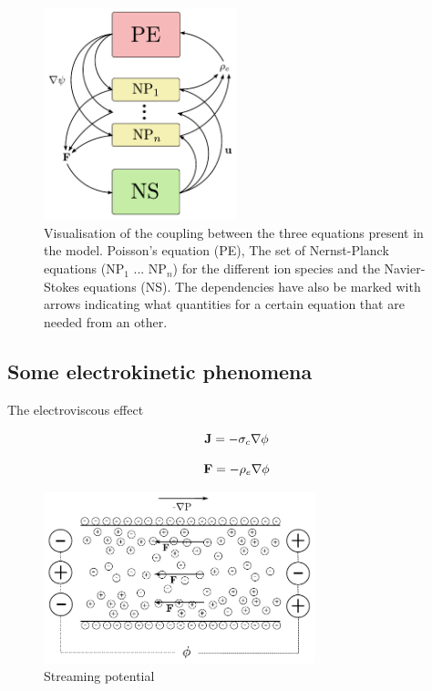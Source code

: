 \begin{frame}
\begin{figure}
\begin{center}
\includegraphics[width=0.5\textwidth]{../fig/coupling.pdf}
\end{center}
\caption{Visualisation of the coupling between the three equations
  present in the model. Poisson's equation (PE), The set of
  Nernst-Planck equations (NP$_1$ ... NP$_n$) for the different ion
  species and the Navier-Stokes equations (NS). The dependencies have
  also be marked with arrows indicating what quantities for a certain
  equation that are needed from an other.}
\label{fig:coupling}
\end{figure}
\end{frame}

\subsection{Some electrokinetic phenomena}

\begin{frame}{The electroviscous effect}

\begin{equation}
\mathbf{J} = -  \sigma_c \nabla \phi  
\end{equation}

\begin{equation}
\mathbf{F} = - \rho_e \nabla \phi
\end{equation}

\begin{figure}
\begin{center}
\includegraphics[width=0.7\textwidth]{../fig/channel_electroviscous.pdf}\\
Streaming potential
\end{center}
\end{figure}

\end{frame}

